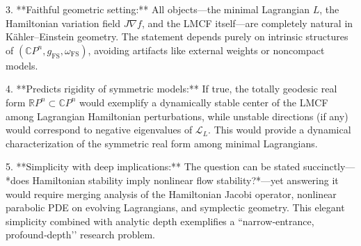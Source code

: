 3. **Faithful geometric setting:**  
   All objects—the minimal Lagrangian \(L\), the Hamiltonian variation field \(J\nabla f\), and the LMCF itself—are completely natural in Kähler–Einstein geometry. The statement depends purely on intrinsic structures of \( (\mathbb{C}P^n,g_{\mathrm{FS}},\omega_{\mathrm{FS}}) \), avoiding artifacts like external weights or noncompact models.

4. **Predicts rigidity of symmetric models:**  
   If true, the totally geodesic real form \( \mathbb{R}P^n \subset \mathbb{C}P^n \) would exemplify a dynamically stable center of the LMCF among Lagrangian Hamiltonian perturbations, while unstable directions (if any) would correspond to negative eigenvalues of \(\mathcal{L}_L\). This would provide a dynamical characterization of the symmetric real form among minimal Lagrangians.

5. **Simplicity with deep implications:**  
   The question can be stated succinctly—*does Hamiltonian stability imply nonlinear flow stability?*—yet answering it would require merging analysis of the Hamiltonian Jacobi operator, nonlinear parabolic PDE on evolving Lagrangians, and symplectic geometry.  
   This elegant simplicity combined with analytic depth exemplifies a “narrow‑entrance, profound‑depth’’ research problem.